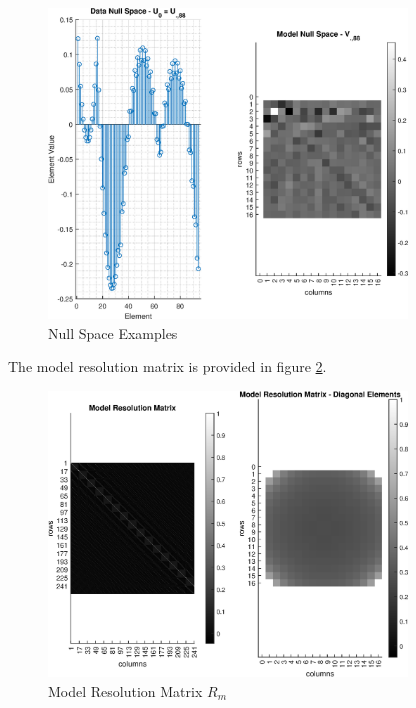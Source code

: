 \begin{figure}[h] 
	\centering
	\includegraphics[width=0.85\textwidth]{./images/prob2_partB_null_space_examples.eps}
	\caption{Null Space Examples}
	\label{fig: prob2 part B null space examples}
\end{figure}
\FloatBarrier

The model resolution matrix is provided in figure \ref{fig: prob2 part B model resolution matrix}. 

\begin{figure}[h] 
	\centering
	\includegraphics[width=0.85\textwidth]{./images/prob2_partB_model_resolution_matrix.eps}
	\caption{Model Resolution Matrix $R_m$}
	\label{fig: prob2 part B model resolution matrix}
\end{figure}
\FloatBarrier

